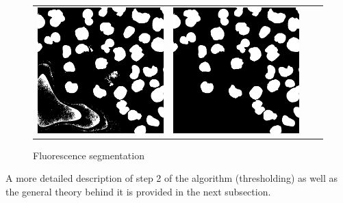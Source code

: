 \begin{figure}[htb]
\begin{tabularx}{\textwidth}{YYYY}
            \includegraphics{bilder/segmentation/nuclei-mask/filled_holes.png} &
            \includegraphics{bilder/segmentation/nuclei-mask/mask.png}
        \end{tabularx}
    \caption{Fluorescence segmentation}
    \label{fig:segmentation-nuclei-steps}
\end{figure}

A more detailed description of step 2 of the algorithm (thresholding) as well as the general theory behind it is provided in the next subsection.
